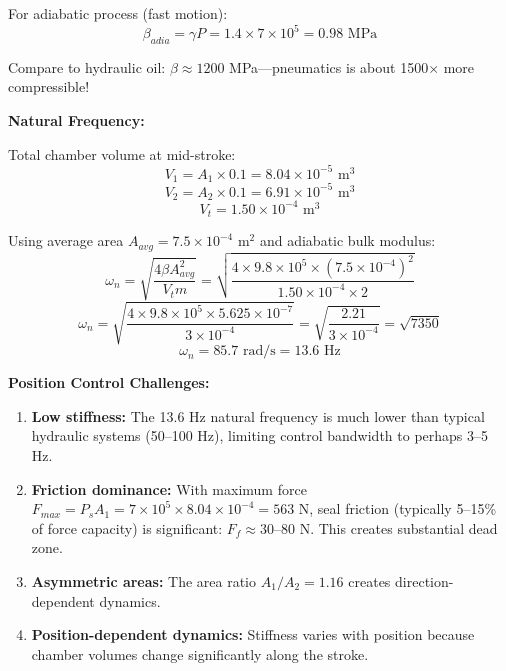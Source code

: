 For adiabatic process (fast motion):
\begin{equation}
    \beta_{adia} = \gamma P = 1.4 \times 7 \times 10^5 = 0.98 \text{ MPa}
\end{equation}

Compare to hydraulic oil: $\beta \approx 1200$ MPa---pneumatics is about 1500$\times$ more compressible!

\textbf{Natural Frequency:}

Total chamber volume at mid-stroke:
\begin{equation}
    V_1 = A_1 \times 0.1 = 8.04 \times 10^{-5} \text{ m}^3
\end{equation}
\begin{equation}
    V_2 = A_2 \times 0.1 = 6.91 \times 10^{-5} \text{ m}^3
\end{equation}
\begin{equation}
    V_t = 1.50 \times 10^{-4} \text{ m}^3
\end{equation}

Using average area $A_{avg} = 7.5 \times 10^{-4}$ m$^2$ and adiabatic bulk modulus:
\begin{equation}
    \omega_n = \sqrt{\frac{4 \beta A_{avg}^2}{V_t m}} = \sqrt{\frac{4 \times 9.8 \times 10^5 \times (7.5 \times 10^{-4})^2}{1.50 \times 10^{-4} \times 2}}
\end{equation}
\begin{equation}
    \omega_n = \sqrt{\frac{4 \times 9.8 \times 10^5 \times 5.625 \times 10^{-7}}{3 \times 10^{-4}}} = \sqrt{\frac{2.21}{3 \times 10^{-4}}} = \sqrt{7350}
\end{equation}
\begin{equation}
    \omega_n = 85.7 \text{ rad/s} = 13.6 \text{ Hz}
\end{equation}

\textbf{Position Control Challenges:}

\begin{enumerate}
    \item \textbf{Low stiffness:} The 13.6 Hz natural frequency is much lower than typical hydraulic systems (50--100 Hz), limiting control bandwidth to perhaps 3--5 Hz.

    \item \textbf{Friction dominance:} With maximum force $F_{max} = P_s A_1 = 7 \times 10^5 \times 8.04 \times 10^{-4} = 563$ N, seal friction (typically 5--15\% of force capacity) is significant: $F_f \approx 30$--80 N. This creates substantial dead zone.

    \item \textbf{Asymmetric areas:} The area ratio $A_1/A_2 = 1.16$ creates direction-dependent dynamics.

    \item \textbf{Position-dependent dynamics:} Stiffness varies with position because chamber volumes change significantly along the stroke.
\end{enumerate}

